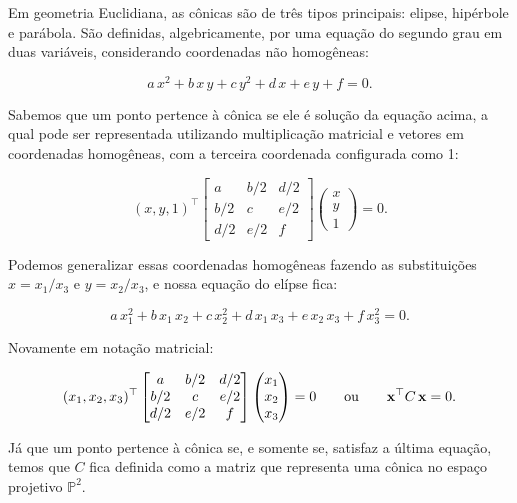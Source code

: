 

Em geometria Euclidiana, as cônicas são de três tipos principais: elipse, hipérbole e parábola. São definidas, algebricamente, por uma equação do segundo grau em duas variáveis, considerando coordenadas não homogêneas:

\begin{equation*}
a\,x^2+b\,x\,y+c\,y^2+d\,x+e\,y+f=0.
\end{equation*}

Sabemos que um ponto pertence à cônica se ele é solução da equação acima, a qual pode ser representada utilizando multiplicação matricial e vetores em coordenadas homogêneas, com a terceira coordenada configurada como 1:

\begin{equation*}
(x,y,1)^\top 
 \begin{bmatrix}
a & b/2 & d/2\\
b/2 & c & e/2\\
d/2 & e/2 & f
\end{bmatrix}
 \begin{pmatrix}
x\\
y\\
1
\end{pmatrix}
 = 0.
\end{equation*}

Podemos generalizar essas coordenadas homogêneas fazendo as substituições $x = x_{1}/x_{3}$ e $y = x_{2}/x_{3}$, e nossa equação do elípse fica:

\begin{equation*}
a\,x_1^2+b\,x_1\,x_2+c\,x_2^2+d\,x_1\,x_3+e\,x_2\,x_3+f\,x_3^2=0.
\end{equation*}

Novamente em notação matricial:

\begin{equation*}
(x_1,x_2,x_3)^\top 
 \begin{bmatrix}
  a & b/2 & d/2\\
  b/2 & c & e/2\\
  d/2 & e/2 & f
  \end{bmatrix}
 \begin{pmatrix}
  x_1\\
  x_2\\
  x_3
  \end{pmatrix}
 = 0
 \qquad \text{ou} \qquad
 \mathbf{x}^\top C\,\mathbf{x} = 0.
\end{equation*}

Já que um ponto pertence à cônica se, e somente se, satisfaz a última equação, temos que $C$ fica definida como a matriz que representa uma cônica no espaço projetivo $\mathbb{P}^2$.

